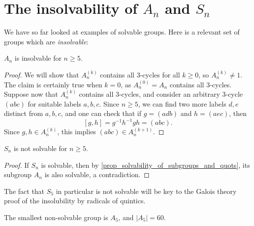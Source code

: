 \section{The insolvability of $A_n$ and $S_n$} 

We have so far looked at examples of solvable groups. Here is a relevant set of groups which are \emph{insolvable}:

\begin{proposition}
    $A_n$ is insolvable for $n \geq 5$.
\end{proposition}

\begin{proof}
    We will show that $A_n^{(k)}$ contains all 3-cycles for all $k \geq 0$, so $A_n^{(k)} \neq 1$. The claim is certainly true when $k = 0$, as $A_n^{(0)} = A_n$ contains all 3-cycles. Suppose now that $A_n^{(k)}$ contains all 3-cycles, and consider an arbitrary 3-cycle $(abc)$ for suitable labels $a, b, c$. Since $n \geq 5$, we can find two more labels $d, e$ distinct from $a, b, c$, and one can check that if $g = (adb)$ and $h = (aec)$, then
    \[
        [g, h] = g^{-1}h^{-1}gh = (abc).
    \]
    Since $g, h \in A_n^{(k)}$, this implies $(abc) \in A_n^{(k + 1)}$.
\end{proof}

\begin{corollary}
    $S_n$ is not solvable for $n \geq 5$.
\end{corollary}

\begin{proof}
    If $S_n$ is solvable, then by \cref{prop_solvability_of_subgroups_and_quots}, its subgroup $A_n$ is also solvable, a contradiction.
\end{proof}

The fact that $S_5$ in particular is not solvable will be key to the Galois theory proof of the insolubility by radicals of quintics.

\begin{remark}
    The smallest non-solvable group is $A_5$, and $|A_5| = 60$.
\end{remark}
